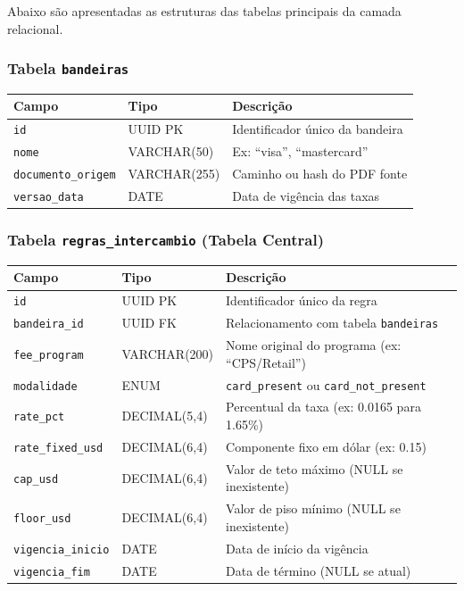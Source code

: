 \documentclass[12pt,a4paper]{article}
\begin{document}
Abaixo são apresentadas as estruturas das tabelas principais da camada relacional.

\subsubsection{Tabela \texttt{bandeiras}}
\begin{tabularx}{\textwidth}{llX}
\toprule
\textbf{Campo} & \textbf{Tipo} & \textbf{Descrição} \\
\midrule
\texttt{id} & UUID PK & Identificador único da bandeira \\
\texttt{nome} & VARCHAR(50) & Ex: ``visa'', ``mastercard'' \\
\texttt{documento\_origem} & VARCHAR(255) & Caminho ou hash do PDF fonte \\
\texttt{versao\_data} & DATE & Data de vigência das taxas \\
\bottomrule
\end{tabularx}

\subsubsection{Tabela \texttt{regras\_intercambio} (Tabela Central)}
\begin{tabularx}{\textwidth}{llX}
\toprule
\textbf{Campo} & \textbf{Tipo} & \textbf{Descrição} \\
\midrule
\texttt{id} & UUID PK & Identificador único da regra \\
\texttt{bandeira\_id} & UUID FK & Relacionamento com tabela \texttt{bandeiras} \\
\texttt{fee\_program} & VARCHAR(200) & Nome original do programa (ex: ``CPS/Retail'') \\
\texttt{modalidade} & ENUM & \texttt{card\_present} ou \texttt{card\_not\_present} \\
\texttt{rate\_pct} & DECIMAL(5,4) & Percentual da taxa (ex: 0.0165 para 1.65\%) \\
\texttt{rate\_fixed\_usd} & DECIMAL(6,4) & Componente fixo em dólar (ex: 0.15) \\
\texttt{cap\_usd} & DECIMAL(6,4) & Valor de teto máximo (NULL se inexistente) \\
\texttt{floor\_usd} & DECIMAL(6,4) & Valor de piso mínimo (NULL se inexistente) \\
\texttt{vigencia\_inicio} & DATE & Data de início da vigência \\
\texttt{vigencia\_fim} & DATE & Data de término (NULL se atual) \\
\bottomrule
\end{tabularx}
\end{document}
